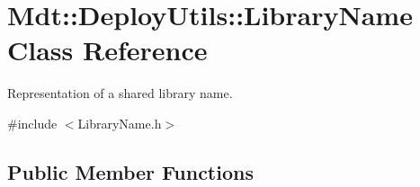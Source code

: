 \hypertarget{class_mdt_1_1_deploy_utils_1_1_library_name}{}\section{Mdt\+:\+:Deploy\+Utils\+:\+:Library\+Name Class Reference}
\label{class_mdt_1_1_deploy_utils_1_1_library_name}


Representation of a shared library name.  




{\ttfamily \#include $<$Library\+Name.\+h$>$}

\subsection*{Public Member Functions}
